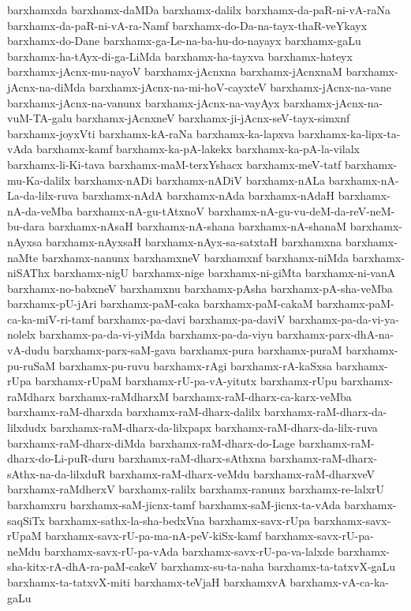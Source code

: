 {barxhamxda
barxhamx-daMDa
barxhamx-dalilx
barxhamx-da-paR-ni-vA-raNa
barxhamx-da-paR-ni-vA-ra-Namf
barxhamx-do-Da-na-tayx-thaR-veYkayx
barxhamx-do-Dane
barxhamx-ga-Le-na-ba-hu-do-nayayx
barxhamx-gaLu
barxhamx-ha-tAyx-di-ga-LiMda
barxhamx-ha-tayxva
barxhamx-hateyx
barxhamx-jAcnx-mu-nayoV
barxhamx-jAcnxna
barxhamx-jAcnxnaM
barxhamx-jAcnx-na-diMda
barxhamx-jAcnx-na-mi-hoV-cayxteV
barxhamx-jAcnx-na-vane
barxhamx-jAcnx-na-vanunx
barxhamx-jAcnx-na-vayAyx
barxhamx-jAcnx-na-vuM-TA-galu
barxhamx-jAcnxneV
barxhamx-ji-jAcnx-seV-tayx-simxnf
barxhamx-joyxVti
barxhamx-kA-raNa
barxhamx-ka-lapxva
barxhamx-ka-lipx-ta-vAda
barxhamx-kamf
barxhamx-ka-pA-lakekx
barxhamx-ka-pA-la-vilalx
barxhamx-li-Ki-tava
barxhamx-maM-terxYshacx
barxhamx-meV-tatf
barxhamx-mu-Ka-dalilx
barxhamx-nADi
barxhamx-nADiV
barxhamx-nALa
barxhamx-nA-La-da-lilx-ruva
barxhamx-nAdA
barxhamx-nAda
barxhamx-nAdaH
barxhamx-nA-da-veMba
barxhamx-nA-gu-tAtxnoV
barxhamx-nA-gu-vu-deM-da-reV-neM-bu-dara
barxhamx-nAsaH
barxhamx-nA-shana
barxhamx-nA-shanaM
barxhamx-nAyxsa
barxhamx-nAyxsaH
barxhamx-nAyx-sa-satxtaH
barxhamxna
barxhamx-naMte
barxhamx-nanunx
barxhamxneV
barxhamxnf
barxhamx-niMda
barxhamx-niSAThx
barxhamx-nigU
barxhamx-nige
barxhamx-ni-giMta
barxhamx-ni-vanA
barxhamx-no-babxneV
barxhamxnu
barxhamx-pAsha
barxhamx-pA-sha-veMba
barxhamx-pU-jAri
barxhamx-paM-caka
barxhamx-paM-cakaM
barxhamx-paM-ca-ka-miV-ri-tamf
barxhamx-pa-davi
barxhamx-pa-daviV
barxhamx-pa-da-vi-ya-nolelx
barxhamx-pa-da-vi-yiMda
barxhamx-pa-da-viyu
barxhamx-parx-dhA-na-vA-dudu
barxhamx-parx-saM-gava
barxhamx-pura
barxhamx-puraM
barxhamx-pu-ruSaM
barxhamx-pu-ruvu
barxhamx-rAgi
barxhamx-rA-kaSxsa
barxhamx-rUpa
barxhamx-rUpaM
barxhamx-rU-pa-vA-yitutx
barxhamx-rUpu
barxhamx-raMdharx
barxhamx-raMdharxM
barxhamx-raM-dharx-ca-karx-veMba
barxhamx-raM-dharxda
barxhamx-raM-dharx-dalilx
barxhamx-raM-dharx-da-lilxdudx
barxhamx-raM-dharx-da-lilxpapx
barxhamx-raM-dharx-da-lilx-ruva
barxhamx-raM-dharx-diMda
barxhamx-raM-dharx-do-Lage
barxhamx-raM-dharx-do-Li-puR-duru
barxhamx-raM-dharx-sAthxna
barxhamx-raM-dharx-sAthx-na-da-lilxduR
barxhamx-raM-dharx-veMdu
barxhamx-raM-dharxveV
barxhamx-raMdherxV
barxhamx-ralilx
barxhamx-ranunx
barxhamx-re-lalxrU
barxhamxru
barxhamx-saM-jicnx-tamf
barxhamx-saM-jicnx-ta-vAda
barxhamx-saqSiTx
barxhamx-sathx-la-sha-bedxVna
barxhamx-savx-rUpa
barxhamx-savx-rUpaM
barxhamx-savx-rU-pa-ma-nA-peV-kiSx-kamf
barxhamx-savx-rU-pa-neMdu
barxhamx-savx-rU-pa-vAda
barxhamx-savx-rU-pa-va-lalxde
barxhamx-sha-kitx-rA-dhA-ra-paM-cakeV
barxhamx-su-ta-naha
barxhamx-ta-tatxvX-gaLu
barxhamx-ta-tatxvX-miti
barxhamx-teVjaH
barxhamxvA
barxhamx-vA-ca-ka-gaLu
}
